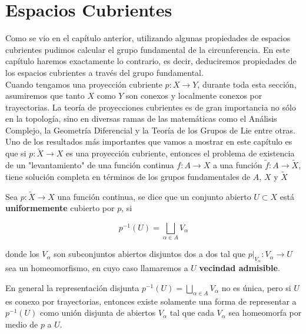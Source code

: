 

\chapter{Espacios Cubrientes}

Como se vio en el cap\'itulo anterior, utilizando algunas propiedades de espacios cubrientes pudimos calcular el grupo fundamental de la circunferencia. En este cap\'itulo haremos exactamente lo contrario, es decir, deduciremos propiedades de los espacios cubrientes a trav\'es del grupo fundamental.\\
Cuando tengamos una proyecci\'on cubriente $p:X \rightarrow Y$, durante toda esta secci\'on, asumiremos que tanto $X$ como $Y$ son conexos y localmente conexos por trayectorias.
La teor\'ia de proyecciones cubrientes es de gran importancia no s\'olo en la topolog\'ia, sino en diversas ramas de las matem\'aticas como el An\'alisis Complejo, la Geometr\'ia Diferencial y la Teor\'ia de los Grupos de Lie entre otras.\\

Uno de los resultados m\'as importantes que vamos a mostrar en este cap\'itulo es que si $p: \widetilde{X} \rightarrow X$ es una proyecci\'on cubriente, entonces el problema de existencia de un "levantamiento" de una funci\'on continua $f:A \rightarrow X$ a una funci\'on $ \widetilde{f} :A \rightarrow \widetilde{X}$, tiene soluci\'on completa en t\'erminos de los grupos fundamentales de $A$, $X$ y $\widetilde{X}$\\

\begin{definition}\label{VecAdmisible}
Sea $p: \widetilde{X} \rightarrow X$ una funci\'on continua, se dice que un conjunto abierto $U \subset X$ est\'a \textbf{uniformemente} cubierto por $p$, si


 $$p^{-1}(U)= \bigsqcup_{\alpha \in A} V_{\alpha}$$ 

donde los $V_{\alpha}$ son subconjuntos abiertos disjuntos dos a dos tal que $p \vert_{V_{\alpha}}:V_{\alpha} \rightarrow U$ sea un homeomorfismo, en cuyo caso llamaremos a $U$ \textbf{vecindad admisible}.\\
 \end{definition}

En general la representaci\'on disjunta $p^{-1}(U)= \bigsqcup_{\alpha \in A} V_{\alpha}$ no es \'unica, pero si $U$ es conexo por trayectorias, entonces existe solamente una forma de representar a $p^{-1}(U)$ como uni\'on disjunta de abiertos $V_{\alpha}$ tal que cada $V_{\alpha}$ sea homeomorfa por medio de $p$ a $U$.\\


